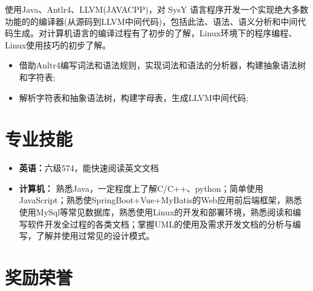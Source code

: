 \documentclass{resume}
\begin{document}
\Contents
{使用Java、Antlr4、LLVM(JAVACPP)，对 SysY 语言程序开发一个实现绝大多数功能的的编译器(从源码到LLVM中间代码)，包括此法、语法、语义分析和中间代码生成。对计算机语言的编译过程有了初步的了解，Linux环境下的程序编程、Linux使用技巧的初步了解。}
{\begin{itemize}
    \item 借助Anltr4编写词法和语法规则，实现词法和语法的分析器，构建抽象语法树和字符表;
    \item 解析字符表和抽象语法树，构建字母表，生成LLVM中间代码;
\end{itemize} }
\sepspace

\section{专业技能}
\begin{itemize}
    \item \textbf{英语：}{六级574，能快速阅读英文文档}
    \item \textbf{计算机：}
    {熟悉Java，一定程度上了解C/C++、python；简单使用JavaScript；熟悉使SpringBoot+Vue+MyBatis的Web应用前后端框架，熟悉使用MySql等常见数据库，熟悉使用Linux的开发和部署环境，熟悉阅读和编写软件开发全过程的各类文档；掌握UML的使用及需求开发文档的分析与编写，了解并使用过常见的设计模式。}
\end{itemize}
\sepspace

\section{奖励荣誉}
\end{document}
